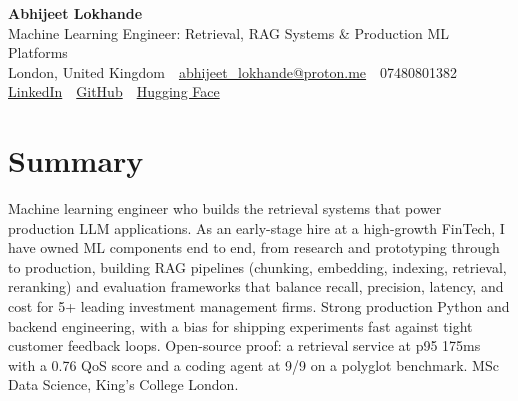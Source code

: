 \documentclass[10pt,a4paper]{article}
\newcommand{\sep}{\,\textcolor{accent!60}{\textbar}\,}
\begin{document}
\begin{center}
  {\fontsize{24}{26}\selectfont\bfseries Abhijeet Lokhande}\\[3pt]
  {\color{accent}\large Machine Learning Engineer: Retrieval, RAG Systems \& Production ML Platforms}\\[5pt]
  {\small
    London, United Kingdom \sep
    \href{mailto:abhijeet_lokhande@proton.me}{abhijeet\_lokhande@proton.me} \sep
    07480801382 \\[2pt]
    \href{https://www.linkedin.com/in/ablds/}{LinkedIn} \sep
    \href{https://github.com/abhijeetscode}{GitHub} \sep
    \href{https://huggingface.co/ab-ai}{Hugging Face}
  }
\end{center}
\vspace{2pt}

\section{Summary}
Machine learning engineer who builds the retrieval systems that power production LLM applications. As an early-stage hire at a high-growth FinTech, I have owned ML components end to end, from research and prototyping through to production, building RAG pipelines (chunking, embedding, indexing, retrieval, reranking) and evaluation frameworks that balance recall, precision, latency, and cost for 5+ leading investment management firms. Strong production Python and backend engineering, with a bias for shipping experiments fast against tight customer feedback loops. Open-source proof: a retrieval service at p95 175ms with a 0.76 QoS score and a coding agent at 9/9 on a polyglot benchmark. MSc Data Science, King's College London.

\end{document}
